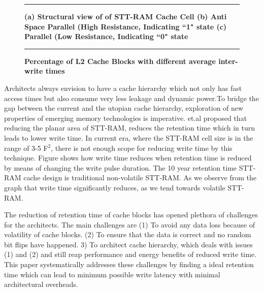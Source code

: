 \begin{wrapfigure}{l}{0.50\textwidth}
\centering
 \hrule
 \caption{\label{fig:motiv} \scriptsize \bf (a) Structural view of of STT-RAM Cache Cell (b) Anti Space Parallel (High Resistance, Indicating ``1" state (c) Parallel (Low Resistance, Indicating ``0" state}
\end{wrapfigure}

\begin{wrapfigure}{l}{0.50\textwidth}
\centering
 \hrule
 \caption{\label{fig:avg} \scriptsize \bf Percentage of L2 Cache Blocks with different average inter-write times}
\end{wrapfigure}




Architects always envision to have a cache hierarchy which not only has fast access times but also consume very less leakage and dynamic power.To bridge the gap between the current and the utopian cache hierarchy,  exploration of new properties of emerging memory technologies is imperative. \cite{sudhanva} et.al proposed that reducing the planar area of STT-RAM, reduces the retention time which in turn leads to lower write time.  In current era, where the STT-RAM cell size is in the range of 3-5 F$^2$, there is not enough scope for reducing write time by this technique. Figure %
shows how write time reduces when retention time is reduced by means of changing the write pulse duration. The 10 year retention time STT-RAM cache design is traditional non-volatile STT-RAM. As we observe from the graph that write time significantly reduces, as we tend towards volatile STT-RAM.  %

The reduction of retention time of cache blocks has opened plethora of challenges for the architects. The main challenges are (1) To avoid any data loss because of volatility of cache blocks. (2) To ensure that the data is correct and no random bit flips have happened. 3) To architect cache hierarchy, which deals with issues (1) and (2) and still reap performance and energy benefits of reduced write time. This paper systematically addresses these challenges by finding a ideal retention time which can lead to minimum possible write latency with minimal architectural overheads.

